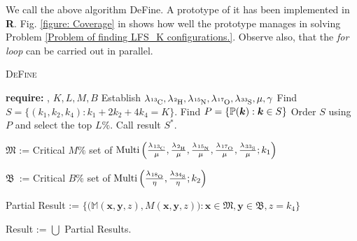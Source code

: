 We call the above algorithm {\sc DeFine}. A prototype of it has been implemented in \textbf{R}.	Fig. \ref{figure: Coverage} in  shows how well the prototype manages in solving Problem \ref{Problem of finding LFS_K configurations.}. Observe also, that the {\it for loop} can be carried out in parallel.

\begin{algorithm}\caption{\textsc{DeFine}}
\begin{algorithmic}[1]\label{DeFine Parallely}
	\State	\textbf{require:} \molecule, $K, L, M, B$
	\State 	Establish $\lambda_\cem{^{13}C}, \lambda_\cem{^{2} H}, \lambda_\cem{^{15}N}, \lambda_\cem{^{17}O}, \lambda_\cem{^{33}S}, \mu, \gamma $
	\State 	Find  		$S = \{ (k_1, k_2, k_4) : k_1 + 2 k_2 + 4 k_4 = K \}$.
	\State 	Find 		$P = \{ \mathbb{P}(\bm{k}) : \bm{k} \in S \}$
	\State 	Order $S$ using $P$ and select the top $L \%$. Call result $S^*$.
	

		\State $\mathfrak{M}$ := Critical $M\%$ set of $\mathrm{Multi} \left(
				\frac{ \lambda_\cem{^{13}C} }{ \mu }, 
				\frac{ \lambda_\cem{^{2} H} }{ \mu }, 
				\frac{ \lambda_\cem{^{15}N} }{ \mu },
				\frac{ \lambda_\cem{^{17}O} }{ \mu }, 
				\frac{ \lambda_\cem{^{33}S} }{ \mu }; 
				k_1
			\right )$

		\State $\mathfrak{B}$ \,:= Critical $B\%$ set of 
		$\mathrm{Multi} \left(
			\frac{ \lambda_\cem{^{18}O} }{ \eta },
			\frac{ \lambda_\cem{^{34}S} }{ \eta }; 
			k_2	
		\right)$		


		\State 	Partial Result := 
			$\Bigg\{ 
				\Big( 
					\mathbb{M}( \bm{x}, \bm{y}, z ), 
					M( \bm{x}, \bm{y}, z )
				\Big) : 
				\bm{x} \in \mathfrak{M}, 
				\bm{y} \in \mathfrak{B}, 
				z = k_4  
			\Bigg\}$
	\ENDFORALL

	\State 	Result := $\bigcup $ Partial Results.
\end{algorithmic}	
\end{algorithm}